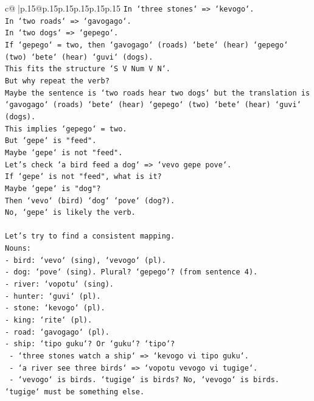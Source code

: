 \documentclass{article}
\begin{document}
{\begin{supertabular}{c@{$\;$}|p{.15\linewidth}@{}p{.15\linewidth}p{.15\linewidth}p{.15\linewidth}p{.15\linewidth}p{.15\linewidth}}
{{{\texttt{In `three stones` => `kevogo`.} \\
\texttt{In `two roads` => `gavogago`.} \\
\texttt{In `two dogs` => `gepego`.} \\
\texttt{If `gepego` = two, then `gavogago` (roads) `bete` (hear) `gepego` (two) `bete` (hear) `guvi` (dogs).} \\
\texttt{This fits the structure `S V Num V N`.} \\
\texttt{But why repeat the verb?} \\
\texttt{Maybe the sentence is `two roads hear two dogs` but the translation is `gavogago` (roads) `bete` (hear) `gepego` (two) `bete` (hear) `guvi` (dogs).} \\
\texttt{This implies `gepego` = two.} \\
\texttt{But `gepe` is "feed".} \\
\texttt{Maybe `gepe` is not "feed".} \\
\texttt{Let's check `a bird feed a dog` => `vevo gepe pove`.} \\
\texttt{If `gepe` is not "feed", what is it?} \\
\texttt{Maybe `gepe` is "dog"?} \\
\texttt{Then `vevo` (bird) `dog` `pove` (dog?).} \\
\texttt{No, `gepe` is likely the verb.} \\
\\ 
\texttt{Let's try to find a consistent mapping.} \\
\texttt{Nouns:} \\
\texttt{{-} bird: `vevo` (sing), `vevogo` (pl).} \\
\texttt{{-} dog: `pove` (sing). Plural? `gepego`? (from sentence 4).} \\
\texttt{{-} river: `vopotu` (sing).} \\
\texttt{{-} hunter: `guvi` (pl).} \\
\texttt{{-} stone: `kevogo` (pl).} \\
\texttt{{-} king: `rite` (pl).} \\
\texttt{{-} road: `gavogago` (pl).} \\
\texttt{{-} ship: `tipo guku`? Or `guku`? `tipo`?} \\
\texttt{  {-} `three stones watch a ship` => `kevogo vi tipo guku`.} \\
\texttt{  {-} `a river see three birds` => `vopotu vevogo vi tugige`.} \\
\texttt{  {-} `vevogo` is birds. `tugige` is birds? No, `vevogo` is birds. `tugige` must be something else.} \\
}}}
\end{supertabular}}
\end{document}
